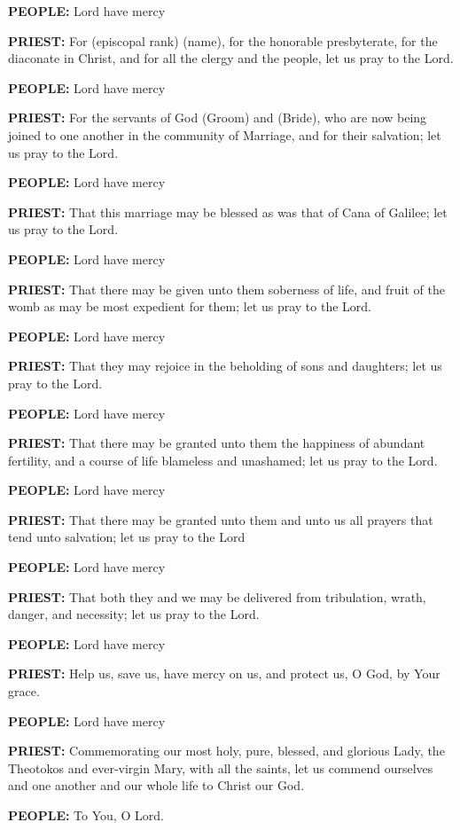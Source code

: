 \textbf{PEOPLE:} Lord have mercy

\textbf{PRIEST:} For (episcopal rank) (name), for the honorable
presbyterate, for the diaconate in Christ, and for all the clergy and
the people, let us pray to the Lord.

\textbf{PEOPLE:} Lord have mercy

\textbf{PRIEST:} For the servants of God (Groom) and (Bride), who are
now being joined to one another in the community of Marriage, and for
their salvation; let us pray to the Lord.

\textbf{PEOPLE:} Lord have mercy

\textbf{PRIEST:} That this marriage may be blessed as was that of Cana
of Galilee; let us pray to the Lord.

\textbf{PEOPLE:} Lord have mercy

\textbf{PRIEST:} That there may be given unto them soberness of life,
and fruit of the womb as may be most expedient for them; let us pray to
the Lord.

\textbf{PEOPLE:} Lord have mercy

\textbf{PRIEST:} That they may rejoice in the beholding of sons and
daughters; let us pray to the Lord.

\textbf{PEOPLE:} Lord have mercy

\textbf{PRIEST:} That there may be granted unto them the happiness of
abundant fertility, and a course of life blameless and unashamed; let us
pray to the Lord.

\textbf{PEOPLE:} Lord have mercy

\textbf{PRIEST:} That there may be granted unto them and unto us all
prayers that tend unto salvation; let us pray to the Lord

\textbf{PEOPLE:} Lord have mercy

\textbf{PRIEST:} That both they and we may be delivered from
tribulation, wrath, danger, and necessity; let us pray to the Lord.

\textbf{PEOPLE:} Lord have mercy

\textbf{PRIEST:} Help us, save us, have mercy on us, and protect us, O
God, by Your grace.

\textbf{PEOPLE:} Lord have mercy

\textbf{PRIEST:} Commemorating our most holy, pure, blessed, and
glorious Lady, the Theotokos and ever-virgin Mary, with all the saints,
let us commend ourselves and one another and our whole life to Christ
our God.

\textbf{PEOPLE:} To You, O Lord.

